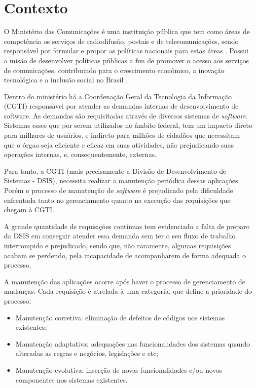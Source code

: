 \chapter[Contexto]{Contexto}

O Ministério das Comunicações é uma instituição pública que tem como áreas de competência os serviços de radiodifusão, postais e de telecomunicações, sendo responsável por formular e propor as políticas nacionais para estas áreas \cite{mcsite001}. Possui a misão de desenvolver políticas públicas a fim de promover o acesso aos serviços de comunicações, contribuindo para o crescimento econômico, a inovação tecnológica e a inclusão social no Brasil \cite{mcsite001}.

Dentro do ministério há a Coordenação Geral da Tecnologia da Informação (CGTI) responsável por atender as demandas internas de desenvolvimento de software. As demandas são requisitadas através de diversos sistemas de \emph{software}. Sistemas esses que por serem utilizados no âmbito federal, tem um impacto direto para milhares de usuários, e indireto para milhões de cidadãos que necessitam que o órgao seja eficiente e eficaz em suas atividades, não prejudicando suas operações internas, e, consequentemente, externas.

Para tanto, a CGTI (mais precisamente a Divisão de Desenvolvimento de Sistemas - DSIS), necessita realizar a manutenção periódica dessas aplicações. Porém o processo de manutenção de \emph{software} é prejudicado pela dificuldade enfrentada tanto no gerenciamento quanto na execução das requisições que chegam à CGTI.

A grande quantidade de requisições contínuas tem evidenciado a falta de preparo da DSIS em conseguir atender essa demanda sem ter o seu fluxo de trabalho interrompido e prejudicado, sendo que, não raramente, algumas requisições acabam se perdendo, pela incapacidade de acompanharem de forma adequada o processo.

A manutenção das aplicações ocorre após haver o processo de gerenciamento de mudanças. Cada requisição é atrelada à uma categoria, que define a prioridade do processo:

\begin{itemize}
  \item Manutenção corretiva: eliminação de defeitos de códigos nos sistemas existentes;
  \item Manutenção adaptativa: adequações nas funcionalidades dos sistemas quando alteradas as regras e negócios, legislações e etc;
  \item Manutenção evolutiva: inserção de novas funcionalidades e/ou novos componentes nos sistemas existentes.
\end{itemize}

